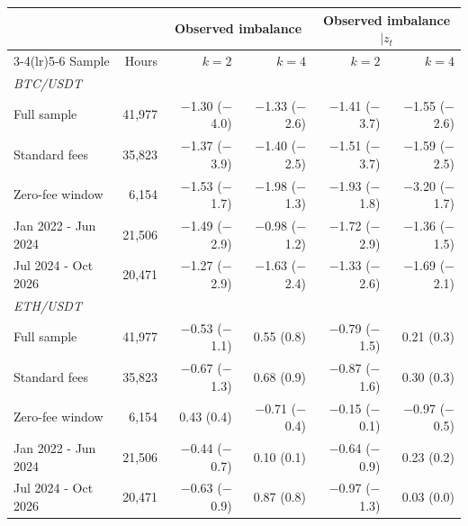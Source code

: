 \begin{tabular}{lrrrrr}
\toprule
 & & \multicolumn{2}{c}{Observed imbalance} & \multicolumn{2}{c}{Observed imbalance $\mid z_t$}\\
\cmidrule(lr){3-4}\cmidrule(lr){5-6} Sample & Hours & $k=2$ & $k=4$ & $k=2$ & $k=4$\\
\midrule
\multicolumn{6}{l}{\emph{BTC/USDT}}\\
Full sample & 41,977 & \ensuremath{-}1.30 (\ensuremath{-}4.0) & \ensuremath{-}1.33 (\ensuremath{-}2.6) & \ensuremath{-}1.41 (\ensuremath{-}3.7) & \ensuremath{-}1.55 (\ensuremath{-}2.6)\\
Standard fees & 35,823 & \ensuremath{-}1.37 (\ensuremath{-}3.9) & \ensuremath{-}1.40 (\ensuremath{-}2.5) & \ensuremath{-}1.51 (\ensuremath{-}3.7) & \ensuremath{-}1.59 (\ensuremath{-}2.5)\\
Zero-fee window & 6,154 & \ensuremath{-}1.53 (\ensuremath{-}1.7) & \ensuremath{-}1.98 (\ensuremath{-}1.3) & \ensuremath{-}1.93 (\ensuremath{-}1.8) & \ensuremath{-}3.20 (\ensuremath{-}1.7)\\
Jan 2022 - Jun 2024 & 21,506 & \ensuremath{-}1.49 (\ensuremath{-}2.9) & \ensuremath{-}0.98 (\ensuremath{-}1.2) & \ensuremath{-}1.72 (\ensuremath{-}2.9) & \ensuremath{-}1.36 (\ensuremath{-}1.5)\\
Jul 2024 - Oct 2026 & 20,471 & \ensuremath{-}1.27 (\ensuremath{-}2.9) & \ensuremath{-}1.63 (\ensuremath{-}2.4) & \ensuremath{-}1.33 (\ensuremath{-}2.6) & \ensuremath{-}1.69 (\ensuremath{-}2.1)\\
\multicolumn{6}{l}{\emph{ETH/USDT}}\\
Full sample & 41,977 & \ensuremath{-}0.53 (\ensuremath{-}1.1) & 0.55 (0.8) & \ensuremath{-}0.79 (\ensuremath{-}1.5) & 0.21 (0.3)\\
Standard fees & 35,823 & \ensuremath{-}0.67 (\ensuremath{-}1.3) & 0.68 (0.9) & \ensuremath{-}0.87 (\ensuremath{-}1.6) & 0.30 (0.3)\\
Zero-fee window & 6,154 & 0.43 (0.4) & \ensuremath{-}0.71 (\ensuremath{-}0.4) & \ensuremath{-}0.15 (\ensuremath{-}0.1) & \ensuremath{-}0.97 (\ensuremath{-}0.5)\\
Jan 2022 - Jun 2024 & 21,506 & \ensuremath{-}0.44 (\ensuremath{-}0.7) & 0.10 (0.1) & \ensuremath{-}0.64 (\ensuremath{-}0.9) & 0.23 (0.2)\\
Jul 2024 - Oct 2026 & 20,471 & \ensuremath{-}0.63 (\ensuremath{-}0.9) & 0.87 (0.8) & \ensuremath{-}0.97 (\ensuremath{-}1.3) & 0.03 (0.0)\\
\bottomrule
\end{tabular}
